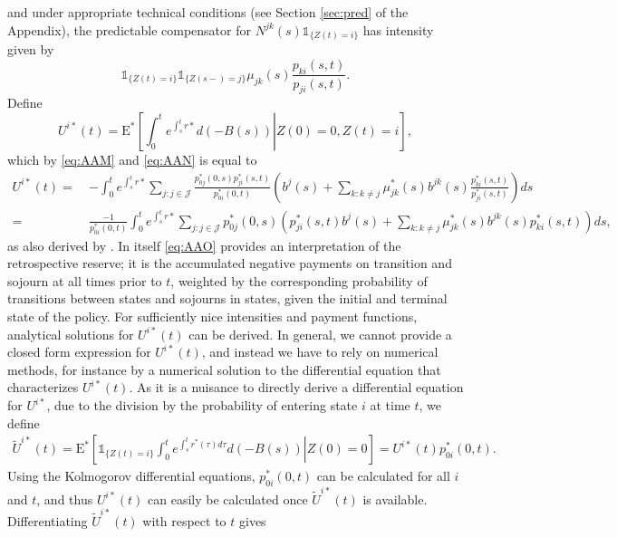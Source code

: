 \documentclass[12pt]{article}
\newcommand{\E}{\text{E}}
\newcommand{\indic}[1]{\mathds{1}_{ \{ #1 \} }}
\theoremstyle{my_thm}
\theoremstyle{my_rem}
\begin{document}
and under appropriate technical conditions (see Section \ref{sec:pred} of the Appendix), the predictable compensator for $N^{jk}(s)\indic{Z(t)=i}$ has intensity given by
\begin{equation}
\indic{Z(t)=i}\indic{Z(s-)=j}\mu_{jk}(s)\frac{p_{ki}(s,t)}{p_{ji}(s,t)}. \label{eq:AAN}
\end{equation}
Define
$$
U^{i*}(t)= \E^*  \left[ \left. \int_0^t e^{\int_s^t r*} d(-B(s)) \right| Z(0)=0, Z(t)=i \right],
$$
which by \eqref{eq:AAM} and \eqref{eq:AAN} is equal to
\begin{align}
U^{i*}(t)= \ & -\int_0^t e^{\int_s^t r*} \sum_{j:j \in \mathcal{J}} \frac{p^*_{0j}(0,s)p^*_{ji}(s,t)}{p^*_{0i}(0,t)} \left(  b^{j}(s) + \sum_{k:k \neq j}  \mu^*_{jk}(s) b^{jk}(s)\frac{p^*_{ki}(s,t)}{p^*_{ji}(s,t)} \right) ds
\label{eq:AAO}\\
= \ &
 \frac{-1}{p^*_{0i}(0,t)}\int_0^t e^{\int_s^t r*} \sum_{j:j \in \mathcal{J}} p^*_{0j}(0,s) \left(p^*_{ji}(s,t)   b^{j}(s) + \sum_{k:k \neq j}  \mu^*_{jk}(s) b^{jk}(s) p^*_{ki}(s,t) \right) ds,  \nonumber
\end{align}
as also derived by \citet{Norberg}. In itself \eqref{eq:AAO} provides an interpretation of the retrospective reserve; it is the accumulated negative payments on transition and sojourn at all times prior to $t$, weighted by the corresponding probability of transitions between states and sojourns in states, given the initial and terminal state of the policy. For sufficiently nice intensities and payment functions, analytical solutions for $U^{i*}(t)$ can be derived. In general, we cannot provide a closed form expression for $U^{i*}(t)$, and instead we have to rely on numerical methods, for instance by a numerical solution to the differential equation that characterizes $U^{i*}(t)$. As it is a nuisance to directly derive a differential equation for $U^{i*}$, due to the division by the probability of entering state $i$ at time $t$, we define
\begin{align*}
\tilde{U}^{i*}(t)= \E^* \left. \left[ \indic{Z(t)=i} \int_0^t e^{\int_s^t r^*(\tau) d\tau} d(-B(s)) \right| Z(0)=0\right] = U^{i*}(t)p^*_{0i}(0,t).
\end{align*}
Using the Kolmogorov differential equations, $p^*_{0i}(0,t)$ can be calculated for all $i$ and $t$, and thus $U^{i*}(t)$ can easily be calculated once $\tilde{U}^{i*}(t)$ is available. Differentiating $\tilde{U}^{i*}(t)$ with respect to $t$ gives
\end{document}
